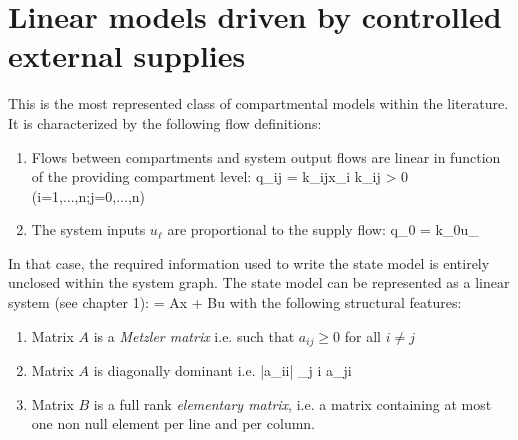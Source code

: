 

\section{Linear models driven by controlled external supplies}

This is the most represented class of compartmental models within the literature.
It is characterized by the following flow definitions:
\begin{enumerate}
\item Flows between compartments and system output flows  are linear in function of the providing compartment level:
\eqnn
q_{ij} = k_{ij}x_i \hspace{1cm} k_{ij} > 0 \hspace{1cm} (i=1,...,n;j=0,...,n)
\eeqnn
\item The system inputs $u_{\ell}$ are proportional to the supply flow: 
\eqnn
q_{0\ell} = k_{0\ell}u_{\ell} 
\eeqnn
\end{enumerate}

In that case, the required information used to write the state model is entirely unclosed within the system graph.
The state model can be represented as a linear system (see chapter 1):
\eqnn
{} = Ax + Bu
\eeqnn
with the following structural features:
\begin{enumerate}
\item Matrix $A$ is a {\em Metzler matrix} i.e. such that $a_{ij} \geq 0$ for all $i \neq j$
\item Matrix $A$ is diagonally dominant i.e.
\eqnn |a_{ii}| \geq \sum_{j \neq i} a_{ji} 
\eeqnn
\item Matrix $B$ is a full rank {\em elementary matrix}, i.e. a matrix containing at most one non null element per line and per column.
\end{enumerate}

